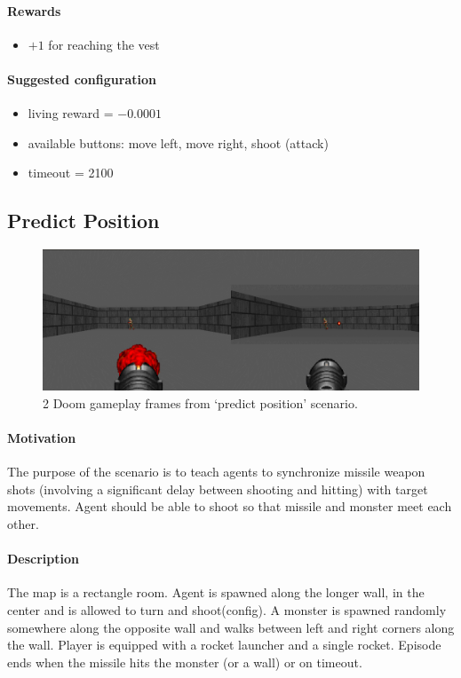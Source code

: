 \documentclass[english,bachelor,a4paper,twoside]{ppfcmthesis}
\begin{document}
		\paragraph{Rewards}

		\begin{itemize}
			\item $+1$ for reaching the vest
		\end{itemize}
		
		\paragraph{Suggested configuration}
		\begin{itemize}
			\item living reward = $-0.0001$
			\item available buttons: move left, move right, shoot (attack)
			\item timeout = 2100
		\end{itemize}
	\newpage

	\subsection{Predict Position}
		\begin{figure}
			\centering
			\includegraphics[scale=0.32]{predict_position.png}
			\caption{2 Doom gameplay frames from `predict position' scenario.}\label{fig:predict_position}
		\end{figure}
		\paragraph{Motivation} 
			The purpose of the scenario is to teach agents to synchronize missile weapon shots (involving a significant delay between shooting and hitting) with target movements. Agent should be able to shoot so that missile and monster meet each other.

		\paragraph{Description}
			The map is a rectangle room. Agent is spawned along the longer wall, in the center and is allowed to turn and shoot(config). A monster is spawned randomly somewhere along the opposite wall and walks between left and right corners along the wall. Player is equipped with a rocket launcher and a single rocket. Episode ends when the missile hits the monster (or a wall) or on timeout.
\end{document}
